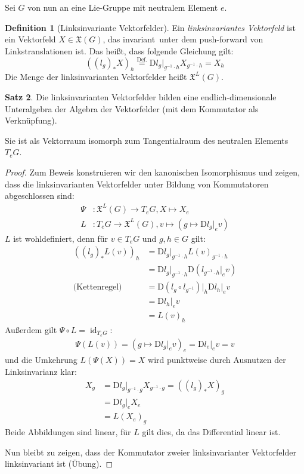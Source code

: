 \documentclass[a4paper]{scrreprt}
\numberwithin{equation}{chapter}
\newcommand{\DD}{\mathrm{D}}
\DeclareMathOperator{\id}{id}
\newcommand{\vf}{\mathfrak{X}}
\theoremstyle{definition}
\newtheorem{defn}{Definition}[section]
\newtheorem{satz}[defn]{Satz}
\begin{document}
		Sei $G$ von nun an eine Lie-Gruppe mit neutralem Element $e$.
		\begin{defn}[Linksinvariante Vektorfelder]
			Ein \emph{linksinvariantes Vektorfeld} ist ein Vektorfeld $X\in\mathfrak{X}(G)$, das \glqq invariant\grqq\ unter dem push-forward von Linkstranslationen ist. Das heißt, dass folgende Gleichung gilt:
			\begin{equation*}
				\left((l_g)_*X\right)_h\stackrel{\text{Def.}}{=}\DD l_g\vert_{g^{-1}\cdot h}X_{g^{-1}\cdot h}=X_h
			\end{equation*}
			Die Menge der linksinvarianten Vektorfelder heißt $\vf^L(G)$.
		\end{defn}
		\begin{satz}
			Die linksinvarianten Vektorfelder bilden eine endlich-dimensionale Unteralgebra der Algebra der Vektorfelder (mit dem Kommutator als Verknüpfung).
			
			Sie ist als Vektorraum isomorph zum Tangentialraum des neutralen Elements $T_eG$.
			\begin{proof}
				Zum Beweis konstruieren wir den kanonischen Isomorphismus und zeigen, dass die linksinvarianten Vektorfelder unter Bildung von Kommutatoren abgeschlossen sind:
				\begin{align}
					\Psi&\colon\vf^L(G)\to T_eG, X\mapsto X_e\nonumber\\
					L&\colon T_eG\rightarrow \vf^L(G), v\mapsto (g\mapsto \DD l_g\vert_e v)\label{def:kan_Iso}
				\end{align}
				$L$ ist wohldefiniert, denn für $v\in T_eG$ und $g,h\in G$ gilt:
				\begin{align*}
					\left((l_g)_*L(v)\right)_h&=\DD l_g\vert_{g^{-1}\cdot h}L(v)_{g^{-1}\cdot h}\\
					&=\DD l_g\vert_{g^{-1}\cdot h}\DD (l_{g^{-1}\cdot h}\vert_e v)\\
					\text{(Kettenregel)}\quad &=\DD\left(l_g\circ l_{g^{-1}}\right)\big\vert _h\DD l_h\vert_e v\\
					&=\DD l_h\vert_e v\\
					&=L(v)_h
				\end{align*}
				Außerdem gilt $\Psi\circ L=\id_{T_eG}$:
				\begin{align*}
					\Psi(L(v))= (g\mapsto \DD l_g\vert_e v)_e=\DD l_e\vert_e v=v
				\end{align*}
				und die Umkehrung $L(\Psi(X))=X$ wird punktweise durch Ausnutzen der Linksinvarianz klar:
				\begin{align*}
					X_g&=\DD l_g\vert_{g^{-1}\cdot g}X_{g^{-1}\cdot g}=\left((l_g)_*X\right)_g\\
					&=\DD l_g\vert_e X_e\\
					&=L(X_e)_g
				\end{align*}
				Beide Abbildungen sind linear, für $L$ gilt dies, da das Differential linear ist.
				
				Nun bleibt zu zeigen, dass der Kommutator zweier linksinvarianter Vektorfelder linksinvariant ist (Übung).
			\end{proof}
		\end{satz}
\end{document}
